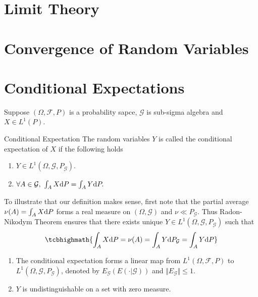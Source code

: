 \section{Limit Theory}
\section{Convergence of Random Variables}




\section{Conditional Expectations}
Suppose $(\Omega,\mathcal{F},P)$ is a probability sapce, $\mathcal G$ is sub-sigma algebra and $X \in L^1(P)$.
\begin{sdefinition}{Conditional Expectation}{}
The random variables $Y$ is called the conditional expectation of $X$ if the following  holds
\begin{enumerate}
  \item $Y \in L^1(\Omega,\mathcal{G},P_{\mathcal{G}}).$
  \item $\forall A \in \mathcal{G}, \ \int_A X \mathrm{d} P = \int_A Y \mathrm{d} P.$ 
\end{enumerate}

\end{sdefinition}
To illustrate that our definition makes sense, first note that the partial average $\nu(A)=\int_A X \mathrm{d} P$ forms a real measure on $(\Omega,\mathcal{G})$ and $\nu \ll P_{\mathcal G}$. Thus Radon-Nikodym Theorem  ensures that there exists unique $Y\in L^1(\Omega,\mathcal{G},P_{\mathcal{G}})$ such that 
$$
 \tcbhighmath{\int_A X \D P  = \nu(A) = \int_A Y \D P_{\mathcal G} = \int_A Y \D P}
$$

\begin{sremark}{}{}
\begin{enumerate}
	\item The conditional expectation forms a linear map from $L^1(\Omega,\mathcal{F},P)$	to $L^1(\Omega,\mathcal{G},P_{\mathcal{G}})$, denoted by $E_{\mathcal G}(E(\cdot|\mathcal G))$ and $\Vert E_{\mathcal G}\Vert\leq 1$.
	\item $Y$ is undistinguishable on a set with zero measure.
\end{enumerate}
\end{sremark}

\begin{theorem}
	
\end{theorem}




